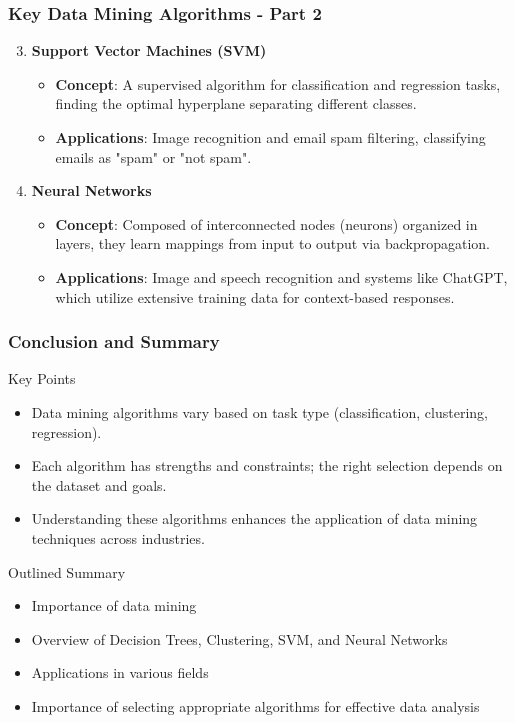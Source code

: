 \documentclass[aspectratio=169]{beamer}
\begin{document}
\begin{frame}[fragile]
    \frametitle{Key Data Mining Algorithms - Part 2}
    
    \begin{enumerate}
        \setcounter{enumi}{2}
        \item \textbf{Support Vector Machines (SVM)}
        \begin{itemize}
            \item \textbf{Concept}: A supervised algorithm for classification and regression tasks, finding the optimal hyperplane separating different classes.
            \item \textbf{Applications}: Image recognition and email spam filtering, classifying emails as "spam" or "not spam".
        \end{itemize}

        \item \textbf{Neural Networks}
        \begin{itemize}
            \item \textbf{Concept}: Composed of interconnected nodes (neurons) organized in layers, they learn mappings from input to output via backpropagation.
            \item \textbf{Applications}: Image and speech recognition and systems like ChatGPT, which utilize extensive training data for context-based responses.
        \end{itemize}
    \end{enumerate}
\end{frame}

\begin{frame}[fragile]
    \frametitle{Conclusion and Summary}
    
    \begin{block}{Key Points}
        \begin{itemize}
            \item Data mining algorithms vary based on task type (classification, clustering, regression).
            \item Each algorithm has strengths and constraints; the right selection depends on the dataset and goals.
            \item Understanding these algorithms enhances the application of data mining techniques across industries.
        \end{itemize}
    \end{block}

    \begin{block}{Outlined Summary}
        \begin{itemize}
            \item Importance of data mining
            \item Overview of Decision Trees, Clustering, SVM, and Neural Networks
            \item Applications in various fields
            \item Importance of selecting appropriate algorithms for effective data analysis
        \end{itemize}
    \end{block}
\end{frame}
\end{document}
